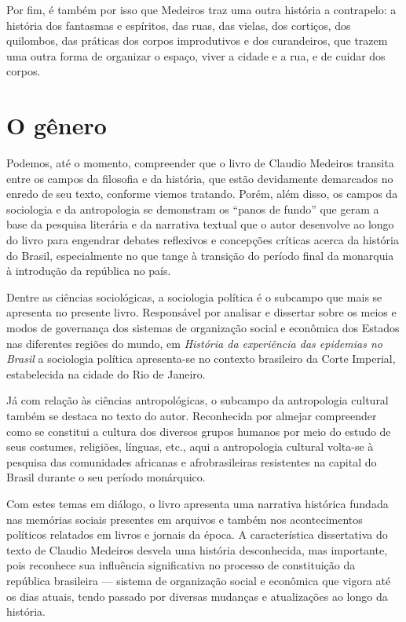 Por fim, é também por isso que Medeiros traz uma outra história a
contrapelo: a história dos fantasmas e espíritos, das ruas, das vielas,
dos cortiços, dos quilombos, das práticas dos corpos improdutivos e dos
curandeiros, que trazem uma outra forma de organizar o espaço, viver a
cidade e a rua, e de cuidar dos corpos.


\section{O gênero}\label{o-guxeanero}

Podemos, até o momento, compreender que o livro de Claudio Medeiros
transita entre os campos da filosofia e da história, que estão
devidamente demarcados no enredo de seu texto, conforme viemos tratando.
Porém, além disso, os campos da sociologia e da antropologia se
demonstram os ``panos de fundo'' que geram a base da pesquisa literária
e da narrativa textual que o autor desenvolve ao longo do livro para
engendrar debates reflexivos e concepções críticas acerca da história do
Brasil, especialmente no que tange à transição do período final da
monarquia à introdução da república no país.

Dentre as ciências sociológicas, a sociologia política é o subcampo que
mais se apresenta no presente livro. Responsável por analisar e
dissertar sobre os meios e modos de governança dos sistemas de
organização social e econômica dos Estados nas diferentes regiões do
mundo, em \textit{História da experiência das epidemias no Brasil} a
sociologia política apresenta-se no contexto brasileiro da Corte
Imperial, estabelecida na cidade do Rio de Janeiro.

Já com relação às ciências antropológicas, o subcampo da antropologia
cultural também se destaca no texto do autor. Reconhecida por almejar
compreender como se constitui a cultura dos diversos grupos humanos por
meio do estudo de seus costumes, religiões, línguas, etc., aqui a
antropologia cultural volta-se à pesquisa das comunidades africanas e
afrobrasileiras resistentes na capital do Brasil durante o seu período
monárquico.

Com estes temas em diálogo, o livro apresenta uma narrativa histórica
fundada nas memórias sociais presentes em arquivos e também nos
acontecimentos políticos relatados em livros e jornais da época. A
característica dissertativa do texto de Claudio Medeiros desvela uma
história desconhecida, mas importante, pois reconhece sua influência
significativa no processo de constituição da república brasileira ---
sistema de organização social e econômica que vigora até os dias atuais,
tendo passado por diversas mudanças e atualizações ao longo da história.

